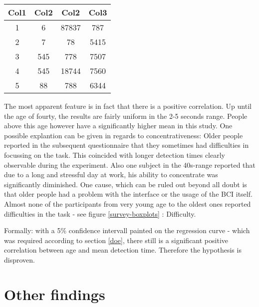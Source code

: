             \begin{table}[h!]
                \centering
                \begin{tabular}{||c c c c||} 
                 \hline
                 Col1 & Col2 & Col2 & Col3 \\ [0.5ex] 
                 \hline\hline
                 1 & 6 & 87837 & 787 \\ 
                 2 & 7 & 78 & 5415 \\
                 3 & 545 & 778 & 7507 \\
                 4 & 545 & 18744 & 7560 \\
                 5 & 88 & 788 & 6344 \\ [1ex] 
                 \hline
                \end{tabular}
                \caption{}
                \label{beta}
            \end{table}


            The most apparent feature is in fact that there is a positive correlation. Up until the age of fourty, the results are fairly uniform in the 2-5 seconds range. People above this age however have a significantly higher mean in this study. One possible explantion can be given in regards to concentrativeness: Older people reported in the subsequent questionnaire that they sometimes had difficulties in focussing on the task. This coincided with longer detection times clearly observable during the experiment. Also one subject in the 40s-range reported that due to a long and stressful day at work, his ability to concentrate was significantly diminished. One cause, which can be ruled out beyond all doubt is that older people had a problem with the interface or the usage of the BCI itself. Almost none of the participants from very young age to the oldest ones reported difficulties in the task - see figure \ref*{survey-boxplots} : Difficulty.

            \medskip

            Formally: with a 5\% confidence intervall painted on the regression curve - which was required according to section \ref*{doe}, there still is a significant positive correlation between age and mean detection time. Therefore the hypothesis is disproven.

        \section{Other findings}\label{other-findings}

